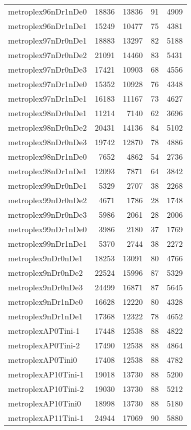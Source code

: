 \begin{tabular}{lrrrr}
metroplex96nDr1nDe0 & 18836 & 13836 & 91 & 4909 \\
metroplex96nDr1nDe1 & 15249 & 10477 & 75 & 4381 \\
metroplex97nDr0nDe1 & 18883 & 13297 & 82 & 5188 \\
metroplex97nDr0nDe2 & 21091 & 14460 & 83 & 5431 \\
metroplex97nDr0nDe3 & 17421 & 10903 & 68 & 4556 \\
metroplex97nDr1nDe0 & 15352 & 10928 & 76 & 4348 \\
metroplex97nDr1nDe1 & 16183 & 11167 & 73 & 4627 \\
metroplex98nDr0nDe1 & 11214 & 7140 & 62 & 3696 \\
metroplex98nDr0nDe2 & 20431 & 14136 & 84 & 5102 \\
metroplex98nDr0nDe3 & 19742 & 12870 & 78 & 4886 \\
metroplex98nDr1nDe0 & 7652 & 4862 & 54 & 2736 \\
metroplex98nDr1nDe1 & 12093 & 7871 & 64 & 3842 \\
metroplex99nDr0nDe1 & 5329 & 2707 & 38 & 2268 \\
metroplex99nDr0nDe2 & 4671 & 1786 & 28 & 1748 \\
metroplex99nDr0nDe3 & 5986 & 2061 & 28 & 2006 \\
metroplex99nDr1nDe0 & 3986 & 2180 & 37 & 1769 \\
metroplex99nDr1nDe1 & 5370 & 2744 & 38 & 2272 \\
metroplex9nDr0nDe1 & 18253 & 13091 & 80 & 4766 \\
metroplex9nDr0nDe2 & 22524 & 15996 & 87 & 5329 \\
metroplex9nDr0nDe3 & 24499 & 16871 & 87 & 5645 \\
metroplex9nDr1nDe0 & 16628 & 12220 & 80 & 4328 \\
metroplex9nDr1nDe1 & 17368 & 12322 & 78 & 4652 \\
metroplexAP0Tini-1 & 17448 & 12538 & 88 & 4822 \\
metroplexAP0Tini-2 & 17490 & 12538 & 88 & 4864 \\
metroplexAP0Tini0 & 17408 & 12538 & 88 & 4782 \\
metroplexAP10Tini-1 & 19018 & 13730 & 88 & 5200 \\
metroplexAP10Tini-2 & 19030 & 13730 & 88 & 5212 \\
metroplexAP10Tini0 & 18998 & 13730 & 88 & 5180 \\
metroplexAP11Tini-1 & 24944 & 17069 & 90 & 5880 \\

\end{tabular}
